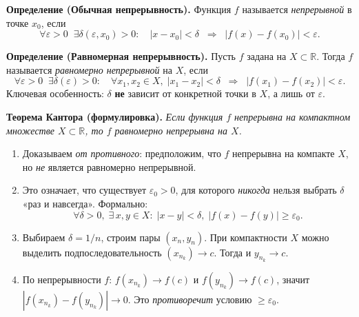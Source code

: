 

\textbf{Определение (Обычная непрерывность).}
Функция $f$ называется \emph{непрерывной} в точке $x_0$, если
\[
\forall \varepsilon>0\;\;\exists \delta(\varepsilon,x_0)>0:
\quad |x - x_0| < \delta
\;\;\Longrightarrow\;\;
|f(x) - f(x_0)| < \varepsilon.
\]

\textbf{Определение (Равномерная непрерывность).}
Пусть $f$ задана на $X \subset \mathbb{R}$. Тогда $f$ называется \emph{равномерно непрерывной} на $X$, если
\[
\forall \varepsilon>0\;\;\exists \delta(\varepsilon)>0:\quad
\forall x_1,x_2 \in X,\; |x_1 - x_2|<\delta
\;\;\Longrightarrow\;\;
|f(x_1)-f(x_2)| < \varepsilon.
\]
Ключевая особенность: \(\delta\) \textbf{не} зависит от конкретной точки в $X$, а лишь от \(\varepsilon\).

\medskip


\textbf{Теорема Кантора (формулировка).}
\emph{Если функция $f$ непрерывна на компактном множестве $X\subset\mathbb{R}$, то $f$ равномерно непрерывна на $X$.}

\medskip


\begin{enumerate}
  \item Доказываем \emph{от противного}: предположим, что $f$ непрерывна на компакте $X$, но \textit{не} является равномерно непрерывной.
  \item Это означает, что существует \(\varepsilon_0>0\), для которого \emph{никогда} нельзя выбрать \(\delta\) «раз и навсегда». Формально:
  \[
    \forall \delta>0,\; \exists\,x,y\in X:\; |x-y|<\delta,\; |f(x)-f(y)|\ge\varepsilon_0.
  \]
  \item Выбираем \(\delta=1/n\), строим пары \((x_n,y_n)\). При компактности $X$ можно выделить подпоследовательность $(x_{n_k}) \to c$. Тогда и $y_{n_k}\to c$.
  \item По непрерывности $f$: $f(x_{n_k})\to f(c)$ и $f(y_{n_k})\to f(c)$, значит \(|f(x_{n_k})-f(y_{n_k})|\to0\). Это \emph{противоречит} условию \(\ge \varepsilon_0\).
\end{enumerate}

\medskip


